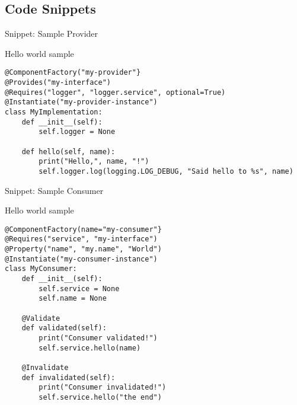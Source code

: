 \subsection{Code Snippets}

\begin{frame}[fragile]{Snippet: Sample Provider}
\begin{block}{Hello world sample}
\begin{verbatim}
@ComponentFactory("my-provider"}
@Provides("my-interface")
@Requires("logger", "logger.service", optional=True)
@Instantiate("my-provider-instance")
class MyImplementation:
    def __init__(self):
        self.logger = None

    def hello(self, name):
        print("Hello,", name, "!")
        self.logger.log(logging.LOG_DEBUG, "Said hello to %s", name)
\end{verbatim}
\end{block}
\end{frame}

\begin{frame}[fragile]{Snippet: Sample Consumer}
\begin{block}{Hello world sample}
\begin{verbatim}
@ComponentFactory(name="my-consumer"}
@Requires("service", "my-interface")
@Property("name", "my.name", "World")
@Instantiate("my-consumer-instance")
class MyConsumer:
    def __init__(self):
        self.service = None
        self.name = None

    @Validate
    def validated(self):
        print("Consumer validated!")
        self.service.hello(name)
	
    @Invalidate
    def invalidated(self):
        print("Consumer invalidated!")
        self.service.hello("the end")
\end{verbatim}
\end{block}
\end{frame}
